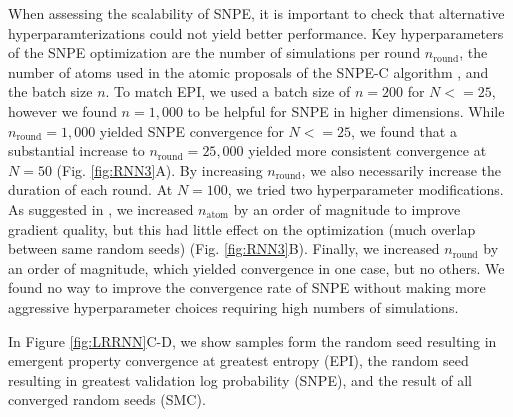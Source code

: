 \documentclass[11pt]{article}
\begin{document}
When assessing the scalability of SNPE, it is important to check that alternative hyperparamterizations could not yield better performance.
Key hyperparameters of the SNPE optimization are the number of simulations per round $n_{\text{round}}$, the number of atoms used in the atomic proposals of the SNPE-C algorithm \cite{greenberg2019automatic}, and the batch size $n$.
To match EPI, we used a batch size of $n = 200$ for $N <= 25$, however we found $n=1,000$ to be helpful for SNPE in higher dimensions.
While $n_{\text{round}} = 1,000$ yielded SNPE convergence for $N <= 25$, we found that a substantial increase to $n_{\text{round}} = 25,000$ yielded more consistent convergence at $N=50$ (Fig. \ref{fig:RNN3}A).
By increasing $n_{\text{round}}$, we also necessarily increase the duration of each round.
At $N=100$, we tried two hyperparameter modifications.
As suggested in \cite{greenberg2019automatic}, we increased $n_{\text{atom}}$ by an order of magnitude to improve gradient quality, but this had little effect on the optimization (much overlap between same random seeds) (Fig. \ref{fig:RNN3}B).
Finally, we increased $n_{\text{round}}$ by an order of magnitude, which yielded convergence in one case, but no others.
We found no way to improve the convergence rate of SNPE without making more aggressive hyperparameter choices requiring high numbers of simulations.

In Figure \ref{fig:LRRNN}C-D, we show samples form the random seed resulting in emergent property convergence at greatest entropy (EPI), the random seed resulting in greatest validation log probability (SNPE), and the result of all converged random seeds (SMC).
\end{document}
